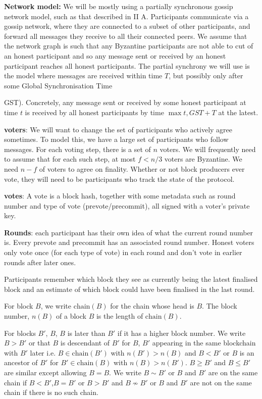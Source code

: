 \documentclass{article}
\begin{document}
{\bf Network model:} We will be mostly using a partially synchronous gossip network model, such as that described in \cite{Tendermint} II A. Participants communicate via a gossip network, where they are connected to a subset of other participants, and forward all messages they receive to all their connected peers. We assume that the network graph is such that any Byzantine participants are not able to cut of an honest participant and so any message sent or received by an honest participant reaches all honest participants. The partial synchrony we will use is the model where messages are received within time $T$, but possibly only after some Global Synchronisation Time{GST). Concretely, any message sent or received by some honest participant at time $t$ is received by all honest participants by time $\max{t,GST}+T$ at the latest.


{\bf voters}: We will want to change the set of participants who actively agree sometimes. To model this, we have a large set of participants who follow messages. For each voting step, there is a set of $n$ voters. We will frequently need to assume that for each such step, at most  $f < n/3$ voters are Byzantine. We need $n-f$ of voters to agree on finality. Whether or not block producers ever vote, they will need to be participants who track the state of the protocol.

{\bf votes}: A vote is a block hash, together with some metadata such as round number and type of vote (prevote/precommit), all signed with a voter's private key.

{\bf Rounds}: each participant has their own idea of what the current round number is. Every prevote and precommit has an associated round number. Honest voters only vote once (for each type of vote) in each round and don't vote in earlier rounds after later ones.

Participants remember which block they see as currently being the latest finalised block and an estimate of which block could have been finalised in the last round.




For block $B$, we write $\mathrm{chain}(B)$ for the chain whose head is $B$. The block number, $n(B)$ of a block $B$ is the length of $\mathrm{chain}(B)$.

For blocks $B'$, $B$, $B$ is later than $B'$ if it has a higher block number.
We write $B > B'$ or that $B$ is descendant of $B'$ for $B$, $B'$ appearing in the same blockchain with $B'$ later i.e. $B \in \mathrm{chain}(B')$ with $n(B') > n(B)$ and $B < B'$ or $B$ is an ancestor of $B'$ for $B' \in \mathrm{chain}(B)$ with $n(B) > n(B')$. $B \geq B'$ and $B \leq B'$ are similar except allowing $B = B$. We write $B \sim B'$ or $B$ and $B'$ are on the same chain if $B<B'$,$B=B'$ or $B> B'$ and $B \nsim B'$ or $B$ and $B'$ are not on the same chain if there is no such chain.

}
\end{document}
